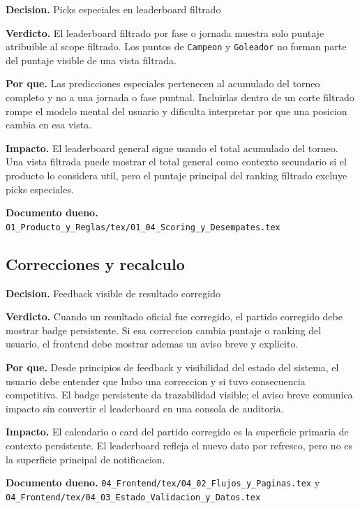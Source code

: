 \begin{docnote}
\textbf{Decision.} Picks especiales en leaderboard filtrado

\textbf{Verdicto.} El leaderboard filtrado por fase o jornada muestra solo puntaje atribuible al scope filtrado. Los puntos de \texttt{Campeon} y \texttt{Goleador} no forman parte del puntaje visible de una vista filtrada.

\textbf{Por que.} Las predicciones especiales pertenecen al acumulado del torneo completo y no a una jornada o fase puntual. Incluirlas dentro de un corte filtrado rompe el modelo mental del usuario y dificulta interpretar por que una posicion cambia en esa vista.

\textbf{Impacto.} El leaderboard general sigue usando el total acumulado del torneo. Una vista filtrada puede mostrar el total general como contexto secundario si el producto lo considera util, pero el puntaje principal del ranking filtrado excluye picks especiales.

\textbf{Documento dueno.} \texttt{01\_Producto\_y\_Reglas/tex/01\_04\_Scoring\_y\_Desempates.tex}
\end{docnote}

\subsection{Correcciones y recalculo}

\begin{docnote}
\textbf{Decision.} Feedback visible de resultado corregido

\textbf{Verdicto.} Cuando un resultado oficial fue corregido, el partido corregido debe mostrar badge persistente. Si esa correccion cambia puntaje o ranking del usuario, el frontend debe mostrar ademas un aviso breve y explicito.

\textbf{Por que.} Desde principios de feedback y visibilidad del estado del sistema, el usuario debe entender que hubo una correccion y si tuvo consecuencia competitiva. El badge persistente da trazabilidad visible; el aviso breve comunica impacto sin convertir el leaderboard en una consola de auditoria.

\textbf{Impacto.} El calendario o card del partido corregido es la superficie primaria de contexto persistente. El leaderboard refleja el nuevo dato por refresco, pero no es la superficie principal de notificacion.

\textbf{Documento dueno.} \texttt{04\_Frontend/tex/04\_02\_Flujos\_y\_Paginas.tex} y \texttt{04\_Frontend/tex/04\_03\_Estado\_Validacion\_y\_Datos.tex}
\end{docnote}

